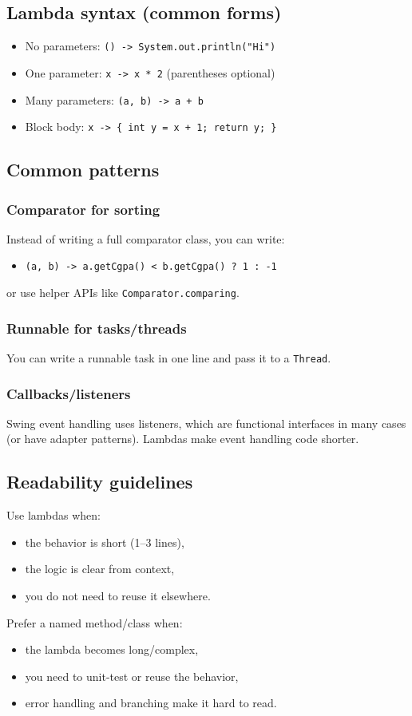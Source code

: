 \documentclass[11pt]{article}
\begin{document}
\subsection{Lambda syntax (common forms)}
\begin{itemize}
  \item No parameters: \texttt{() -> System.out.println("Hi")}
  \item One parameter: \texttt{x -> x * 2} (parentheses optional)
  \item Many parameters: \texttt{(a, b) -> a + b}
  \item Block body: \texttt{x -> \{ int y = x + 1; return y; \}}
\end{itemize}

\subsection{Common patterns}
\subsubsection{Comparator for sorting}
Instead of writing a full comparator class, you can write:
\begin{itemize}
  \item \texttt{(a, b) -> a.getCgpa() < b.getCgpa() ? 1 : -1}
\end{itemize}
or use helper APIs like \texttt{Comparator.comparing}.

\subsubsection{Runnable for tasks/threads}
You can write a runnable task in one line and pass it to a \texttt{Thread}.

\subsubsection{Callbacks/listeners}
Swing event handling uses listeners, which are functional interfaces in many cases (or have adapter patterns).
Lambdas make event handling code shorter.

\subsection{Readability guidelines}
Use lambdas when:
\begin{itemize}
  \item the behavior is short (1--3 lines),
  \item the logic is clear from context,
  \item you do not need to reuse it elsewhere.
\end{itemize}
Prefer a named method/class when:
\begin{itemize}
  \item the lambda becomes long/complex,
  \item you need to unit-test or reuse the behavior,
  \item error handling and branching make it hard to read.
\end{itemize}
\notesources{\OOPSUnitIVSources}
\end{document}
